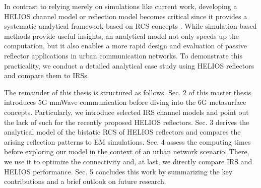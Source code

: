 In contrast to relying merely on simulations like current work, developing a HELIOS channel model or reflection model becomes critical since it provides a systematic analytical framework based on \ac{RCS} concepts \cite{Balanis, Kerr1989PropagationOS}. While simulation-based methods provide useful insights, an analytical model not only speeds up the computation, but it also enables a more rapid design and evaluation of passive reflector applications in urban communication networks. To demonstrate this practicality, we conduct a detailed analytical case study using HELIOS reflectors and compare them to \ac{IRS}s.

The remainder of this thesis is structured as follows. Sec. 2 of this master thesis introduces 5G mmWave communication before diving into the 6G metasurface concepts. Particularly, we introduce selected \ac{IRS} channel models and point out the lack of such for the recently proposed \ac{HELIOS} reflectors. Sec. 3 derives the analytical model of the bistatic RCS of \ac{HELIOS} reflectors and compares the arising reflection patterns to EM simulations. Sec. 4 assess the computing times before exploring our model in the context of an urban network scenario. There, we use it to optimize the connectivity and, at last, we directly compare \ac{IRS} and \ac{HELIOS} performance. Sec. 5 concludes this work by summarizing the key contributions and a brief outlook on future research.
